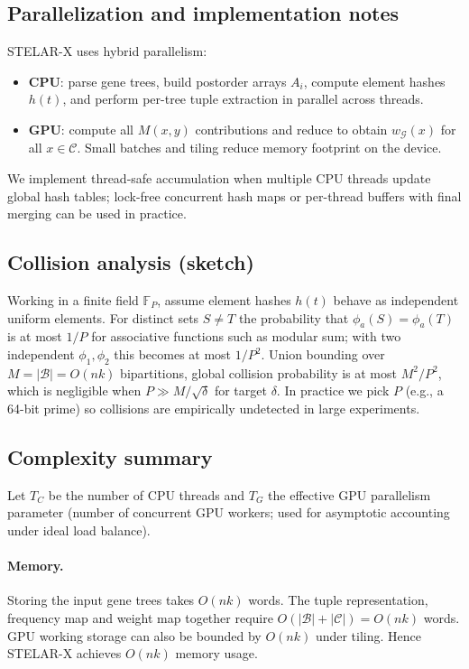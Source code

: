 \documentclass[10pt,a4paper]{article}
\begin{document}
\begin{enumerate}
\subsection{Parallelization and implementation notes}
\label{subsec:parallel}

STELAR-X uses hybrid parallelism:

\begin{itemize}
  \item \textbf{CPU}: parse gene trees, build postorder arrays $A_i$, compute element hashes $h(t)$, and perform per-tree tuple extraction in parallel across threads.
  \item \textbf{GPU}: compute all $M(x,y)$ contributions and reduce to obtain $w_{\mathcal{G}}(x)$ for all $x\in\mathcal{C}$. Small batches and tiling reduce memory footprint on the device.
\end{itemize}

We implement thread-safe accumulation when multiple CPU threads update global hash tables; lock-free concurrent hash maps or per-thread buffers with final merging can be used in practice.

\subsection{Collision analysis (sketch)}
\label{subsec:collision}

Working in a finite field $\mathbb{F}_P$, assume element hashes $h(t)$ behave as independent uniform elements. For distinct sets $S\ne T$ the probability that $\phi_a(S)=\phi_a(T)$ is at most $1/P$ for associative functions such as modular sum; with two independent $\phi_1,\phi_2$ this becomes at most $1/P^2$. Union bounding over $M=|\mathcal{B}|=O(nk)$ bipartitions, global collision probability is at most $M^2/P^2$, which is negligible when $P\gg M/\sqrt{\delta}$ for target $\delta$. In practice we pick $P$ (e.g., a 64-bit prime) so collisions are empirically undetected in large experiments.

\subsection{Complexity summary}
\label{subsec:complexity}

Let $T_C$ be the number of CPU threads and $T_G$ the effective GPU parallelism parameter (number of concurrent GPU workers; used for asymptotic accounting under ideal load balance).

\paragraph{Memory.} Storing the input gene trees takes $O(nk)$ words. The tuple representation, frequency map and weight map together require $O(|\mathcal{B}|+|\mathcal{C}|)=O(nk)$ words. GPU working storage can also be bounded by $O(nk)$ under tiling. Hence STELAR-X achieves $O(nk)$ memory usage.


\end{enumerate}
\end{document}
